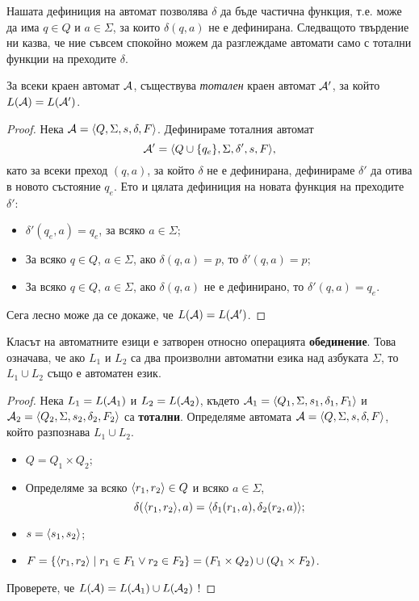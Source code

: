 Нашата дефиниция на автомат позволява $\delta$ да бъде частична функция, т.е.
може да има $q\in Q$ и $a\in\Sigma$, за които $\delta(q,a)$ не е дефинирана.
Следващото твърдение ни казва, че ние съвсем спокойно можем да разглеждаме автомати
само с тотални функции на преходите  $\delta$.
\begin{prop}
  За всеки краен автомат $\mathcal{A}$, съществува {\em тотален} краен автомат $\mathcal{A}'$,
  за който $L(\mathcal{A}) = L(\mathcal{A}')$.
\end{prop}
\begin{proof}
  Нека $\mathcal{A} = \langle{Q,\Sigma,s,\delta,F}\rangle$.
  Дефинираме тоталния автомат 
  \[\mathcal{A}' = \langle{Q\cup\{q_e\}, \Sigma, \delta', s, F}\rangle,\]
  като за всеки преход $(q,a)$, за който $\delta$ не е дефинирана, 
  дефинираме $\delta'$ да отива в новото състояние $q_e$.
  Ето и цялата дефиниция на новата функция на преходите $\delta'$:
  \begin{itemize}
  \item 
    $\delta'(q_e,a) = q_e$, за всяко $a\in\Sigma$;
  \item
    За всяко $q\in Q$, $a\in\Sigma$, ако $\delta(q,a) = p$, то
    $\delta'(q,a) = p$;
  \item
    За всяко $q\in Q$, $a\in\Sigma$, ако $\delta(q,a)$ не е дефинирано, то
    $\delta'(q,a) = q_e$.
  \end{itemize}
  Сега лесно може да се докаже, че $L(\mathcal{A}) = L(\mathcal{A}')$.
\end{proof}

\begin{prop}
  \label{pr:automata-union}
  Класът на автоматните езици е затворен относно операцията {\bf обединение}.
  Това означава, че ако $L_1$ и $L_2$ са два произволни автоматни езика над азбуката $\Sigma$, то $L_1\cup L_2$
  също е автоматен език.
\end{prop}
\begin{proof}
  Нека $L_1 = L(\mathcal{A}_1)$ и $L_2 = L(\mathcal{A}_2)$, 
  където $\mathcal{A}_1 = \langle{Q_1,\Sigma,s_1,\delta_1,F_1}\rangle$ и $\mathcal{A}_2 = \langle{Q_2,\Sigma,s_2,\delta_2,F_2}\rangle$ са {\bf тотални}.
  Определяме автомата $\mathcal{A} = \langle{Q,\Sigma,s,\delta,F}\rangle$, който разпознава $L_1\cup L_2$.
  \begin{itemize}
  \item
    $Q = Q_1\times Q_2$;
  \item
    Определяме за всяко $\langle{r_1,r_2}\rangle \in Q$ и всяко $a \in \Sigma$,
    \[\delta(\langle{r_1,r_2}\rangle,a) = \langle{\delta_1(r_1,a),\delta_2(r_2,a)}\rangle;\]
  \item
    $s = \langle{s_1,s_2}\rangle$;
  \item
    $F = \{\langle{r_1,r_2}\rangle\mid r_1\in F_1\vee r_2 \in F_2\} = (F_1\times Q_2)\cup (Q_1\times F_2)$.
  \end{itemize}
  Проверете, че $L(\mathcal{A}) = L(\mathcal{A}_1)\cup L(\mathcal{A}_2)$ !
\end{proof}

